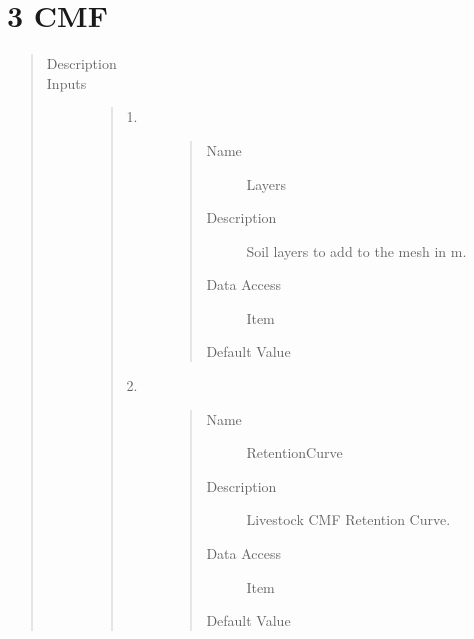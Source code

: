 \documentclass[letterpaper,10pt,english]{sphinxmanual}
\begin{document}
\section{3 \textbar{} CMF}
\label{\detokenize{components:cmf}}
\begin{quote}\begin{description}
\item[{Description}] \leavevmode
{}

\item[{Inputs}] \leavevmode\begin{quote}\begin{description}
\item[{1.}] \leavevmode\begin{quote}\begin{description}
\item[{Name}] \leavevmode
Layers

\item[{Description}] \leavevmode
Soil layers to add to the mesh in m.

\item[{Data Access}] \leavevmode
Item

\item[{Default Value}] \leavevmode
{}

\end{description}\end{quote}

\item[{2.}] \leavevmode\begin{quote}\begin{description}
\item[{Name}] \leavevmode
RetentionCurve

\item[{Description}] \leavevmode
Livestock CMF Retention Curve.

\item[{Data Access}] \leavevmode
Item

\item[{Default Value}] \leavevmode
{}


\end{description}
\end{quote}
\end{description}
\end{quote}
\end{description}
\end{quote}
\end{document}
